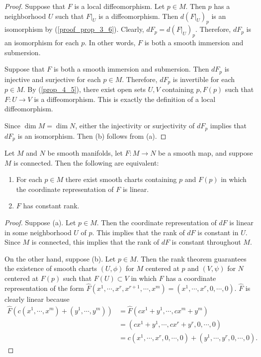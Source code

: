\begin{proof}
  Suppose that $F$ is a local diffeomorphism.
  Let $p \in M$.
  Then $p$ has a neighborhood $U$ such that $F\vert_U$ is a diffeomorphism.
  Then $d(F\vert_U)_p$ is an isomorphism by (\ref{proof_prop_3_6}).
  Clearly, $dF_p = d(F\vert_U)_p$.
  Therefore, $dF_p$ is an isomorphism for each $p$.
  In other words, $F$ is both a smooth immersion and submersion.

  Suppose that $F$ is both a smooth immersion and submersion.
  Then $dF_p$ is injective and surjective for each $p \in M$.
  Therefore, $dF_p$ is invertible for each $p \in M$.
  By (\ref{prop_4_5}), there exist open sets $U, V$ containing $p, F(p)$ such that $F:U \rightarrow V$ is a diffeomorphism.
  This is exactly the definition of a local diffeomorphism.

  Since $\dim M = \dim N$, either the injectivity or surjectivity of $dF_p$ implies that $dF_p$ is an isomorphism.
  Then (b) follows from (a).
\end{proof}

\begin{customthm}{4.13}
  Let $M$ and $N$ be smooth manifolds, let $F: M \rightarrow N$ be a smooth map, and suppose $M$ is connected.
  Then the following are equivalent:
  \begin{enumerate}[label=(\alph*)]
    \item 
      For each $p \in M$ there exist smooth charts containing $p$ and $F(p)$ in which the coordinate representation of $F$ is linear.
    \item
      $F$ has constant rank.
  \end{enumerate}
\end{customthm}

\begin{proof}
  Suppose (a).
  Let $p \in M$.
  Then the coordinate representation of $dF$ is linear in some neighborhood $U$ of $p$.
  This implies that the rank of $dF$ is constant in $U$.
  Since $M$ is connected, this implies that the rank of $dF$ is constant throughout $M$.

  On the other hand, suppose (b).
  Let $p \in M$.
  Then the rank theorem guarantees the existence of smooth charts $(U, \phi)$ for $M$ centered at $p$ and $(V, \psi)$ for $N$ centered at $F(p)$ such that $F(U) \subset V$ in which $F$ has a coordinate representation of the form $\hat{F}(x^1, \cdots, x^r, x^{r + 1}, \cdots, x^m) = (x^1, \cdots, x^r, 0, \cdots, 0)$.
  $\hat{F}$ is clearly linear because 
  \begin{align*}
    \hat{F}(c(x^1, \cdots, x^m) + (y^1, \cdots, y^m))
      &= \hat{F}(cx^1 + y^1, \cdots, cx^m + y^m) \\
      &= (cx^1 + y^1, \cdots, cx^r + y^r, 0, \cdots, 0) \\
      &= c(x^1, \cdots, x^r, 0, \cdots, 0) + (y^1, \cdots, y^r, 0, \cdots, 0).
  \end{align*}
\end{proof}

